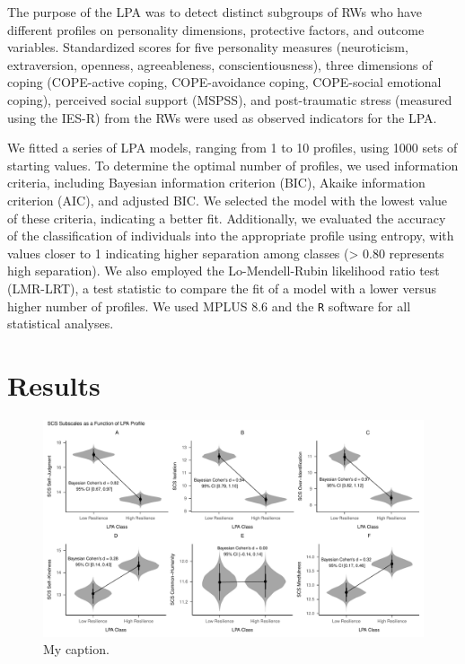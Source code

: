 \documentclass[
  man]{apa7}
\begin{document}
The purpose of the LPA was to detect distinct subgroups of RWs who have different profiles on personality dimensions, protective factors, and outcome variables. Standardized scores for five personality measures (neuroticism, extraversion, openness, agreeableness, conscientiousness), three dimensions of coping (COPE-active coping, COPE-avoidance coping, COPE-social emotional coping), perceived social support (MSPSS), and post-traumatic stress (measured using the IES-R) from the RWs were used as observed indicators for the LPA.

We fitted a series of LPA models, ranging from 1 to 10 profiles, using 1000 sets of starting values. To determine the optimal number of profiles, we used information criteria, including Bayesian information criterion (BIC), Akaike information criterion (AIC), and adjusted BIC. We selected the model with the lowest value of these criteria, indicating a better fit. Additionally, we evaluated the accuracy of the classification of individuals into the appropriate profile using entropy, with values closer to 1 indicating higher separation among classes (\textgreater{} 0.80 represents high separation). We also employed the Lo-Mendell-Rubin likelihood ratio test (LMR-LRT), a test statistic to compare the fit of a model with a lower versus higher number of profiles. We used MPLUS 8.6 and the \texttt{R} software for all statistical analyses.

\hypertarget{results}{%
\section{Results}\label{results}}

\begin{figure}
\centering
\includegraphics{figures/scs_subscales_lpa.pdf}
\caption{\label{fig:unnamed-chunk-1}My caption.}
\end{figure}
\end{document}
